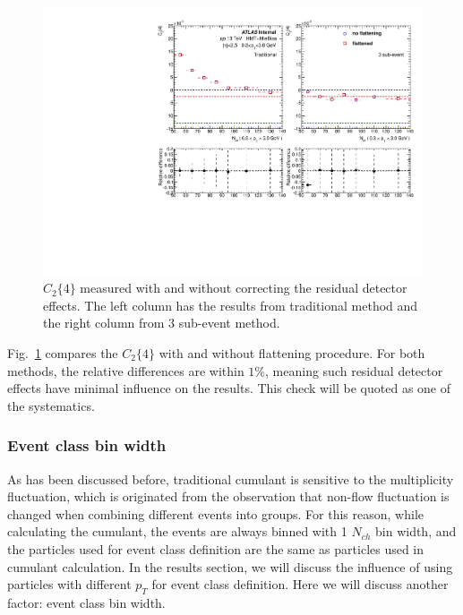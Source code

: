 \begin{figure}[H]
\centering
\includegraphics[width=0.8\linewidth]{figs/sec_sys/pp13/sys_pp13_flat.pdf}
\caption{$C_{2}\{4\}$ measured with and without correcting the residual detector effects. The left column has the results from traditional method and the right column from 3 sub-event method.}
\label{fig:sys_pp13_flat}
\end{figure}
Fig.~\ref{fig:sys_pp13_flat} compares the $C_{2}\{4\}$ with and without flattening procedure. For both methods, the relative differences are within $1\%$, meaning such residual detector effects have minimal influence on the results. This check will be quoted as one of the systematics.


\subsubsection{Event class bin width}
As has been discussed before, traditional cumulant is sensitive to the multiplicity fluctuation, which is originated from the observation that non-flow fluctuation is changed when combining different events into groups. For this reason, while calculating the cumulant, the events are always binned with 1 $N_{ch}$ bin width, and the particles used for event class definition are the same as particles used in cumulant calculation. In the results section, we will discuss the influence of using particles with different $p_{T}$ for event class definition. Here we will discuss another factor: event class bin width.

